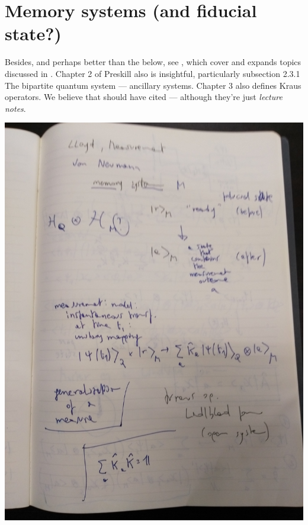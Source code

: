 \section{Memory systems (and fiducial state?)}\label{sec:qmemory}
Besides, and perhaps better than the below, see \cite[Ch.~3]{PreskillNotes},
which cover and expands topics discussed in \cite{open_systems}. Chapter 2
of Preskill \cite{PreskillNotes} also is insightful, particularly
subsection 2.3.1 The bipartite quantum system --- ancillary systems. Chapter 3
also defines Kraus operators. We believe that \cite{Lloyd:Time} should
have cited \cite{PreskillNotes} --- although they're just \emph{lecture notes}.

\clearpage\includegraphics[width=\linewidth]{img/pw/qmem/1.jpg}
